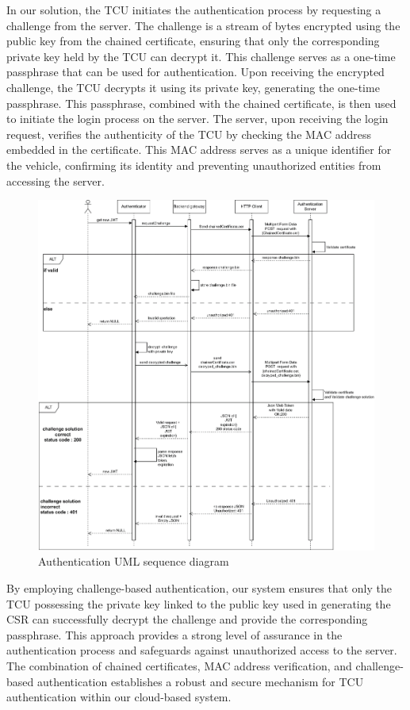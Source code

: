 \documentclass[
12pt,
oneside, 
onehalfspacing, 
nolistspacing, 
parskip, 
chapterinoneline, 
]{AASTCOMPUTER}
\begin{document}
In our solution, the TCU initiates the authentication process by requesting a challenge from the server. The challenge is a stream of bytes encrypted using the public key from the chained certificate, ensuring that only the corresponding private key held by the TCU can decrypt it. This challenge serves as a one-time passphrase that can be used for authentication. Upon receiving the encrypted challenge, the TCU decrypts it using its private key, generating the one-time passphrase. This passphrase, combined with the chained certificate, is then used to initiate the login process on the server. The server, upon receiving the login request, verifies the authenticity of the TCU by checking the MAC address embedded in the certificate. This MAC address serves as a unique identifier for the vehicle, confirming its identity and preventing unauthorized entities from accessing the server.

\begin{figure}[!ht]
\centering
\includegraphics[scale=0.33]{Figures/26.png}
\caption[Authentication UML sequence diagram]{Authentication UML sequence diagram}
\label{fig:TCU}
\end{figure}

\clearpage

By employing challenge-based authentication, our system ensures that only the TCU possessing the private key linked to the public key used in generating the CSR can successfully decrypt the challenge and provide the corresponding passphrase. This approach provides a strong level of assurance in the authentication process and safeguards against unauthorized access to the server. The combination of chained certificates, MAC address verification, and challenge-based authentication establishes a robust and secure mechanism for TCU authentication within our cloud-based system.
\end{document}
